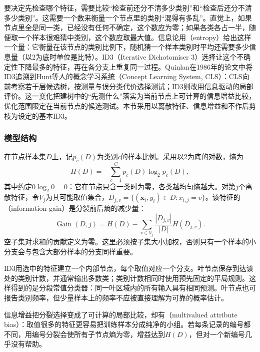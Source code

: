 要决定先检查哪个特征，需要比较“检查前还分不清多少类别”和“检查后还分不清多少类别”。这需要一个数来衡量一个节点里的类别“混得有多乱”。直觉上，如果节点里全是同一类，已经没有任何不确定，这个数应为零；如果各类各占一半，随便取一个样本很难猜中类别，这个数应取最大值。信息论用（entropy）给出这样一个量：它衡量在该节点的类别比例下，随机猜一个样本类别时平均还需要多少信息量（以2为底时单位是比特）。ID3（Iterative Dichotomiser 3）选择让这个不确定性下降最多的特征，再在各分支上重复同一过程。Quinlan在1986年的论文中将ID3追溯到Hunt等人的概念学习系统（Concept Learning System, CLS）：CLS向前考察若干层候选树，按测量与误分类代价选择测试；ID3则改用信息驱动的局部评价。这一变化把建树中的“先测什么”落实为当前节点上可计算的信息增益比较，优化范围限定在当前节点的候选测试。本节采用以离散特征、信息增益和不作后剪枝为设定的基本ID3。

\subsubsection{模型结构}
\label{sec:classification-id3-structure}

在节点样本集$D$上，记$p_c(D)$为类别$c$的样本比例。采用以2为底的对数，熵为
\begin{equation}
  H(D)=-\sum_{c=1}^{C}p_c(D)\log_2 p_c(D),
  \label{eq:classification-entropy}
\end{equation}
其中约定$0\log_2 0=0$：它在节点只含一类时为零，各类越均匀熵越大。对第$j$个离散特征，令$V_j$为其可能取值集合，$D_{j,v}=\{(\bm{x}_i,y_i)\in D:x_{i,j}=v\}$。该特征的（information gain）是分裂前后熵的减少量：
\begin{equation}
  \operatorname{Gain}(D,j)
  =H(D)-\sum_{v\in V_j}\frac{|D_{j,v}|}{|D|}H(D_{j,v}).
  \label{eq:classification-information-gain}
\end{equation}
空子集对求和的贡献定义为零。这里必须按子集大小加权，否则只有一个样本的小分支会与包含大部分样本的分支同样重要。

ID3用选中的特征建立一个内部节点，每个取值对应一个分支。叶节点保存到达该处的类别计数，并通常输出多数类；类别计数相同时使用预先固定的平局规则。这样得到的是分段常值分类器：同一叶区域内的所有输入具有相同预测。叶节点也可报告类别频率，但少量样本上的频率不应被直接理解为可靠的概率估计。

信息增益把分裂选择变成了可计算的局部比较，却有（multivalued attribute bias）：取值很多的特征更容易把训练样本分成纯净的小组。若每条记录的编号都不同，用编号分裂会使所有子节点熵为零，增益达到$H(D)$，但对一个新编号几乎没有帮助。

